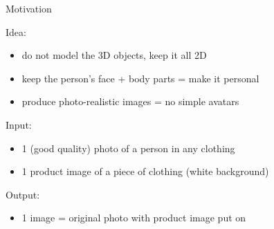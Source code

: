 \documentclass{beamer}
\begin{document}
\begin{frame}{Motivation}

Idea:
\begin{itemize}
\item do not model the 3D objects, keep it all 2D
\item keep the person's face + body parts = make it personal
\item produce photo-realistic images = no simple avatars
\end{itemize}


\vfill

Input: 
\begin{itemize}
\item 1 (good quality) photo of a person in any clothing
\item 1 product image of a piece of clothing (white background)
\end{itemize}

\vfill

Output:
\begin{itemize}
\item 1 image = original photo with product image put on
\end{itemize}
\end{frame}
\end{document}
